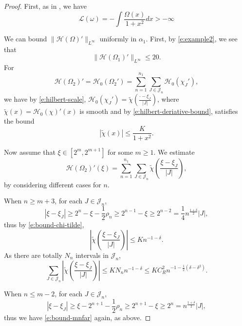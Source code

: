 \documentclass[reqno,12pt,letterpaper]{amsart}
\numberwithin{equation}{section}
\numberwithin{prop}{section}
\begin{document}
\begin{proof}
First, as in \cite[Lemma 3.1]{fullgap}, we have 
\begin{equation*}
\mathcal{L}(\omega)=-\int\frac{\Omega(x)}{1+x^2}dx>-\infty
\end{equation*}

We can bound $\|\mathcal{H}(\Omega)'\|_{L^\infty}$ uniformly in $\alpha_1$. First, by \eqref{e:example2}, we see that 
\begin{equation}
\label{e:bound-omeag-1}
\|\mathcal{H}(\Omega_1)'\|_{L^\infty}\leq 20.
\end{equation}
For
\begin{equation*}
\mathcal{H}(\Omega_2)'=\mathcal{H}_0(\Omega_2')
=\sum_{n=1}^{n_1}\sum_{J\in\mathcal{J}_n}\mathcal{H}_0(\chi_J'),
\end{equation*}
we have by \eqref{e:hilbert-scale}, $\mathcal{H}_0(\chi_J')=\widetilde{\chi}\left(\frac{\cdot-\xi_J}{|J|}\right)$, where $\widetilde{\chi}(x)=\mathcal{H}_0(\chi)'(x)$ is smooth and by \eqref{e:hilbert-deriative-bound},
satisfies the bound
\begin{equation}
\label{e:bound-chi-tilde}
|\widetilde{\chi}(x)|\leq\frac{K}{1+x^2}.
\end{equation}

Now assume that $\xi\in[2^m,2^{m+1}]$ for some $m\geq1$. We estimate
\begin{equation*}
\mathcal{H}(\Omega_2)'(\xi)=\sum_{n=1}^{n_1}\sum_{J\in\mathcal{J}_n}\widetilde{\chi}\left(\frac{\xi-\xi_J}{|J|}\right),
\end{equation*}
by considering different cases for $n$.

When $n\geq m+3$, for each $J\in\mathcal{J}_n$, 
\begin{equation*}
|\xi-\xi_J|\geq 2^n-\xi-\frac{1}{2}\rho_n\geq 2^{n-1}-\xi\geq 2^{n-2}=\frac{1}{4}n^{\frac{1+\delta}{2}}|J|,
\end{equation*}
thus by \eqref{e:bound-chi-tilde}, 
\begin{equation*}
\left|\widetilde{\chi}\left(\frac{\xi-\xi_J}{|J|}\right)\right|\leq Kn^{-1-\delta}.
\end{equation*}
As there are totally $N_n$ intervals in $\mathcal{J}_n$, 
\begin{equation}
\label{e:bound-mnfar}
\sum_{J\in\mathcal{J}_n}\left|\widetilde{\chi}\left(\frac{\xi-\xi_J}{|J|}\right)\right|
\leq KN_nn^{-1-\delta}
\leq KC_R^2n^{-1-\frac{1}{2}(\delta-\delta^2)}.
\end{equation}

When $n\leq m-2$, for each $J\in\mathcal{J}_n$,
\begin{equation*}
|\xi-\xi_J|\geq \xi-2^{n+1}-\frac{1}{2}\rho_n\geq 2^{n+1}-\xi\geq 2^n=n^{\frac{1+\delta}{2}}|J|,
\end{equation*}
thus we have \eqref{e:bound-mnfar} again, as above.


\end{proof}
\end{document}
